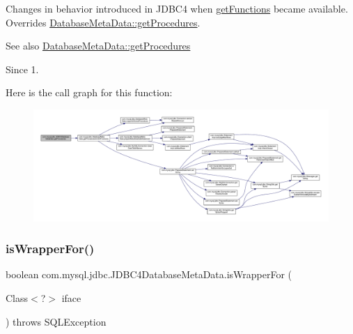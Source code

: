 Changes in behavior introduced in J\+D\+B\+C4 when \mbox{\hyperlink{classcom_1_1mysql_1_1jdbc_1_1_database_meta_data_a01609207bf0f104ae316e507c1250ec5}{get\+Functions}} became available. Overrides \mbox{\hyperlink{classcom_1_1mysql_1_1jdbc_1_1_database_meta_data_a622efd6d2cc33569fba43123f4622843}{Database\+Meta\+Data\+::get\+Procedures}}.

\begin{DoxySeeAlso}{See also}
\mbox{\hyperlink{classcom_1_1mysql_1_1jdbc_1_1_database_meta_data_a622efd6d2cc33569fba43123f4622843}{Database\+Meta\+Data\+::get\+Procedures}} 
\end{DoxySeeAlso}
\begin{DoxySince}{Since}
1. 
\end{DoxySince}
Here is the call graph for this function\+:
\nopagebreak
\begin{figure}[H]
\begin{center}
\leavevmode
\includegraphics[width=350pt]{classcom_1_1mysql_1_1jdbc_1_1_j_d_b_c4_database_meta_data_a7a77761d3bbbc91d21f84c243f7cf5d8_cgraph}
\end{center}
\end{figure}
\mbox{\label{classcom_1_1mysql_1_1jdbc_1_1_j_d_b_c4_database_meta_data_ab5b9cc928959ab14feba202c230b1a54}} 
\subsubsection{\texorpdfstring{is\+Wrapper\+For()}{isWrapperFor()}}
{\footnotesize\ttfamily boolean com.\+mysql.\+jdbc.\+J\+D\+B\+C4\+Database\+Meta\+Data.\+is\+Wrapper\+For (\begin{DoxyParamCaption}\item[{Class$<$?$>$}]{iface }\end{DoxyParamCaption}) throws S\+Q\+L\+Exception}

